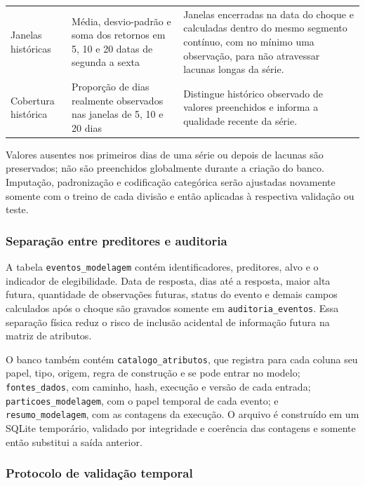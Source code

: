 \documentclass[12pt,a4paper]{article}
\begin{document}
\begin{table}[htbp]
\begin{tabular}{p{3.4cm}p{5.3cm}p{6.0cm}}
        Janelas históricas &
        Média, desvio-padrão e soma dos retornos em 5, 10 e 20 datas de segunda a sexta &
        Janelas encerradas na data do choque e calculadas dentro do mesmo
        segmento contínuo, com no mínimo uma observação, para não atravessar
        lacunas longas da série. \\

        Cobertura histórica &
        Proporção de dias realmente observados nas janelas de 5, 10 e 20 dias &
        Distingue histórico observado de valores preenchidos e informa a
        qualidade recente da série. \\
        \bottomrule
    \end{tabular}
\end{table}

Valores ausentes nos primeiros dias de uma série ou depois de lacunas são
preservados; não são preenchidos globalmente durante a criação do banco.
Imputação, padronização e codificação categórica serão ajustadas novamente
somente com o treino de cada divisão e então aplicadas à respectiva validação
ou teste.

\subsubsection{Separação entre preditores e auditoria}

A tabela \texttt{eventos\_modelagem} contém identificadores, preditores, alvo e
o indicador de elegibilidade. Data de resposta, dias até a resposta, maior alta
futura, quantidade de observações futuras, status do evento e demais campos
calculados após o choque são gravados somente em
\texttt{auditoria\_eventos}. Essa separação física reduz o risco de inclusão
acidental de informação futura na matriz de atributos.

O banco também contém \texttt{catalogo\_atributos}, que registra para cada
coluna seu papel, tipo, origem, regra de construção e se pode entrar no modelo;
\texttt{fontes\_dados}, com caminho, hash, execução e versão de cada entrada;
\texttt{particoes\_modelagem}, com o papel temporal de cada evento; e
\texttt{resumo\_modelagem}, com as contagens da execução. O arquivo é construído
em um SQLite temporário, validado por integridade e coerência das contagens e
somente então substitui a saída anterior.

\subsubsection{Protocolo de validação temporal}
\end{document}
